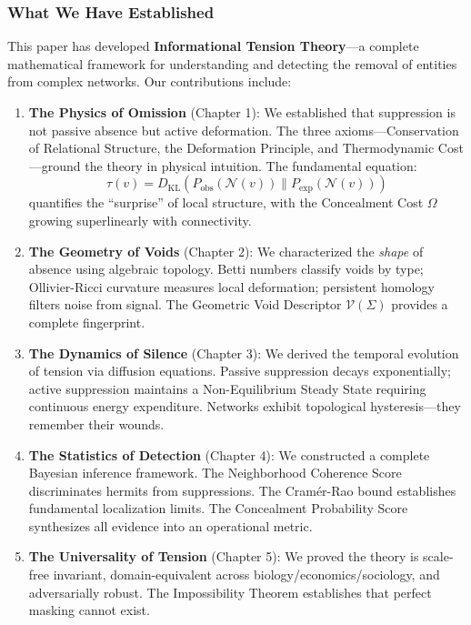 \documentclass[12pt,a4paper]{article}
\theoremstyle{definition}
\theoremstyle{remark}
\begin{document}
\subsubsection{What We Have Established}

This paper has developed \textbf{Informational Tension Theory}—a complete mathematical framework for understanding and detecting the removal of entities from complex networks. Our contributions include:

\begin{enumerate}
    \item \textbf{The Physics of Omission} (Chapter 1): We established that suppression is not passive absence but active deformation. The three axioms—Conservation of Relational Structure, the Deformation Principle, and Thermodynamic Cost—ground the theory in physical intuition. The fundamental equation:
    \begin{equation}
        \tau(v) = D_{\text{KL}}(P_{\text{obs}}(\mathcal{N}(v)) \| P_{\text{exp}}(\mathcal{N}(v)))
    \end{equation}
    quantifies the ``surprise'' of local structure, with the Concealment Cost $\Omega$ growing superlinearly with connectivity.
    
    \item \textbf{The Geometry of Voids} (Chapter 2): We characterized the \emph{shape} of absence using algebraic topology. Betti numbers classify voids by type; Ollivier-Ricci curvature measures local deformation; persistent homology filters noise from signal. The Geometric Void Descriptor $\mathcal{V}(\Sigma)$ provides a complete fingerprint.
    
    \item \textbf{The Dynamics of Silence} (Chapter 3): We derived the temporal evolution of tension via diffusion equations. Passive suppression decays exponentially; active suppression maintains a Non-Equilibrium Steady State requiring continuous energy expenditure. Networks exhibit topological hysteresis—they remember their wounds.
    
    \item \textbf{The Statistics of Detection} (Chapter 4): We constructed a complete Bayesian inference framework. The Neighborhood Coherence Score discriminates hermits from suppressions. The Cramér-Rao bound establishes fundamental localization limits. The Concealment Probability Score synthesizes all evidence into an operational metric.
    
    \item \textbf{The Universality of Tension} (Chapter 5): We proved the theory is scale-free invariant, domain-equivalent across biology/economics/sociology, and adversarially robust. The Impossibility Theorem establishes that perfect masking cannot exist.
\end{enumerate}
\end{document}
